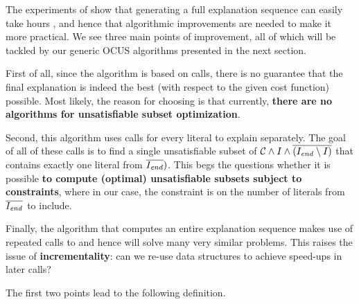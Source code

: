 The experiments of \citet{ecai/BogaertsGCG20} show that generating a full explanation sequence can easily take hours , and hence that algorithmic improvements are needed to make it more practical. 
We see three main points of improvement, all of which will be tackled by our generic OCUS algorithms presented in the next section. 
\begin{inparaenum}
 \item First of all, since the algorithm is based on  calls, there is no guarantee that the final explanation is indeed the best (with respect to the given cost function) possible. 
 Most likely, the reason for choosing  is that currently, \textbf{there are no algorithms for unsatisfiable subset optimization}. 
 \item Second, this algorithm uses  calls for every literal to explain separately. The goal of all of these calls is to find a single unsatisfiable subset of $\mathcal{C}  \land I \land \overline{(I_\mathit{end} \setminus I)}$ that contains exactly one literal from $\overline{I_\mathit{end} })$. This begs the questions whether it is possible \textbf{to compute (optimal) unsatisfiable subsets subject to constraints}, where in our case, the constraint is on the number of literals from $\overline{I_\mathit{end} }$ to include. 
 \item Finally, the algorithm that computes an entire explanation sequence makes use of repeated calls to \onestep and hence will solve many very similar problems. This raises the issue of \textbf{incrementality}: can we re-use data structures to achieve speed-ups in later calls? 
\end{inparaenum}

The first two points lead to the following definition. 


